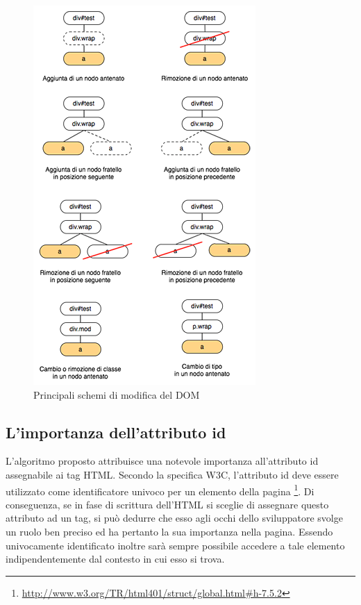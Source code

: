 \begin{figure}[htbp]
\begin{center}
\includegraphics{images/dom_mod.png}
\caption{Principali schemi di modifica del DOM}
\label{fig:domMod}
\end{center}
\end{figure}

\subsection {L'importanza dell'attributo id}

L'algoritmo proposto attribuisce una notevole importanza all'attributo id assegnabile ai tag HTML. Secondo la specifica W3C, l'attributo id deve essere utilizzato come identificatore univoco per un elemento della pagina \footnote{\url{http://www.w3.org/TR/html401/struct/global.html\#h-7.5.2}}. Di conseguenza, se in fase di scrittura dell'HTML si sceglie di assegnare questo attributo ad un tag, si può dedurre che esso agli occhi dello sviluppatore svolge un ruolo ben preciso ed ha pertanto la sua importanza nella pagina. Essendo univocamente identificato inoltre sarà sempre possibile accedere a tale elemento indipendentemente dal contesto in cui esso si trova. 

